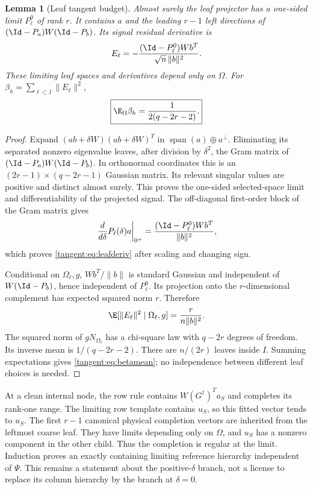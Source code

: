 \documentclass[11pt,oneside,openany,a4paper]{book}
\numberwithin{equation}{chapter}
\newtheorem{lemma}[theorem]{Lemma}
\theoremstyle{definition}
\theoremstyle{remark}
\begin{document}
\begin{lemma}[Leaf tangent budget]\label{tangent:lem:leafderiv}
Almost surely the leaf projector has a one-sided limit $P_\ell^0$ of rank $r$. It contains $a$ and the leading $r-1$ left directions of $(\Id-P_a)W(\Id-P_b)$. Its signal residual derivative is
\begin{equation}\label{tangent:eq:leafderiv}
 E_\ell=-\frac{(\Id-P_\ell^0)Wb^T}{\sqrt n\,\|b\|^2}.
\end{equation}
These limiting leaf spaces and derivatives depend only on $\Omega$. For
$\beta_h=\sum_{\ell\subset I}\|E_\ell\|^2$,
\begin{equation}\label{tangent:eq:betamean}
 \boxed{\E_\Omega\beta_h=\frac1{2(q-2r-2)}.}
\end{equation}
\end{lemma}
\begin{proof}
Expand $(ab+\delta W)(ab+\delta W)^T$ in $\operatorname{span}(a)\oplus a^\perp$. Eliminating its separated nonzero eigenvalue leaves, after division by $\delta^2$, the Gram matrix of $(\Id-P_a)W(\Id-P_b)$. In orthonormal coordinates this is an $(2r-1)\times(q-2r-1)$ Gaussian matrix. Its relevant singular values are positive and distinct almost surely. This proves the one-sided selected-space limit and differentiability of the projected signal. The off-diagonal first-order block of the Gram matrix gives
\[
 \left.\frac d{d\delta}P_\ell(\delta)a\right|_{0^+}
 =\frac{(\Id-P_\ell^0)Wb^T}{\|b\|^2},
\]
which proves \eqref{tangent:eq:leafderiv} after scaling and changing sign.

Conditional on $\Omega_\ell,g$, $Wb^T/\|b\|$ is standard Gaussian and independent of $W(\Id-P_b)$, hence independent of $P_\ell^0$. Its projection onto the $r$-dimensional complement has expected squared norm $r$. Therefore
\[
 \E[\|E_\ell\|^2\mid\Omega_\ell,g]=\frac r{n\|b\|^2}.
\]
The squared norm of $gN_{\Omega_\ell}$ has a chi-square law with $q-2r$ degrees of freedom. Its inverse mean is $1/(q-2r-2)$. There are $n/(2r)$ leaves inside $I$. Summing expectations gives \eqref{tangent:eq:betamean}; no independence between different leaf choices is needed.
\end{proof}

At a clean internal node, the row rule contains $W(G^\dagger)^Ta_S$ and completes its rank-one range. The limiting row template contains $u_S$, so this fitted vector tends to $u_S$. The first $r-1$ canonical physical completion vectors are inherited from the leftmost coarse leaf. They have limits depending only on $\Omega$, and $u_S$ has a nonzero component in the other child. Thus the completion is regular at the limit. Induction proves an exactly containing limiting reference hierarchy independent of $\Psi$. This remains a statement about the positive-$\delta$ branch, not a license to replace its column hierarchy by the branch at $\delta=0$.
\end{document}
